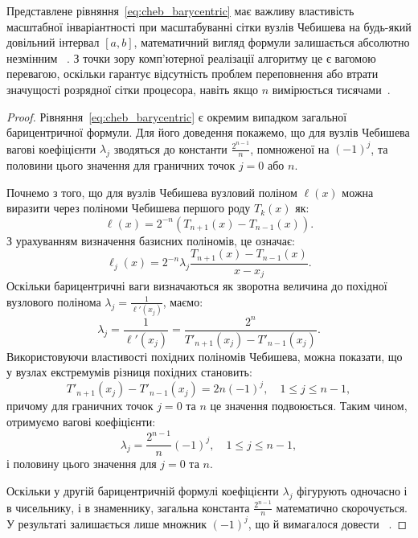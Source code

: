 Представлене рівняння~\eqref{eq:cheb_barycentric} має важливу властивість масштабної інваріантності при масштабуванні сітки вузлів Чебишева на будь-який довільний інтервал $[a, b]$, математичний вигляд формули залишається абсолютно незмінним ~\cite{trefethen2013approximation}. З точки зору комп'ютерної реалізації алгоритму це є вагомою перевагою, оскільки гарантує відсутність проблем переповнення або втрати значущості розрядної сітки процесора, навіть якщо $n$ вимірюється тисячами~\cite{trefethen2013approximation}.

\begin{proof}
	Рівняння~\eqref{eq:cheb_barycentric} є окремим випадком загальної барицентричної формули. Для його доведення покажемо, що для вузлів Чебишева вагові коефіцієнти $\lambda_j$ зводяться до константи $\frac{2^{n-1}}{n}$, помноженої на $(-1)^j$, та половини цього значення для граничних точок $j=0$ або $n$.
	
	Почнемо з того, що для вузлів Чебишева вузловий поліном $\ell(x)$ можна виразити через поліноми Чебишева першого роду $T_k(x)$ як:
	\begin{equation}
		\ell(x) = 2^{-n} (T_{n+1}(x) - T_{n-1}(x)).
	\end{equation}
	З урахуванням визначення базисних поліномів, це означає:
	\begin{equation}
		\ell_j(x) = 2^{-n} \lambda_j \frac{T_{n+1}(x) - T_{n-1}(x)}{x - x_j}.
	\end{equation}
	Оскільки барицентричні ваги визначаються як зворотна величина до похідної вузлового полінома $\lambda_j = \frac{1}{\ell'(x_j)}$, маємо:
	\begin{equation}
		\lambda_j = \frac{1}{\ell'(x_j)} = \frac{2^n}{T'_{n+1}(x_j) - T'_{n-1}(x_j)}.
	\end{equation}
	Використовуючи властивості похідних поліномів Чебишева, можна показати, що у вузлах екстремумів різниця похідних становить:
	\begin{equation}
		T'_{n+1}(x_j) - T'_{n-1}(x_j) = 2n(-1)^j, \quad 1 \le j \le n-1,
	\end{equation}
	причому для граничних точок $j=0$ та $n$ це значення подвоюється. Таким чином, отримуємо вагові коефіцієнти:
	\begin{equation}\label{eq:lambda_cheb_proof}
		\lambda_j = \frac{2^{n-1}}{n}(-1)^j, \quad 1 \le j \le n-1,
	\end{equation}
	і половину цього значення для $j=0$ та $n$.
	
	Оскільки у другій барицентричній формулі коефіцієнти $\lambda_j$ фігурують одночасно і в чисельнику, і в знаменнику, загальна константа $\frac{2^{n-1}}{n}$ математично скорочується. У результаті залишається лише множник $(-1)^j$, що й вимагалося довести ~\cite{trefethen2013approximation}.
\end{proof}
%
